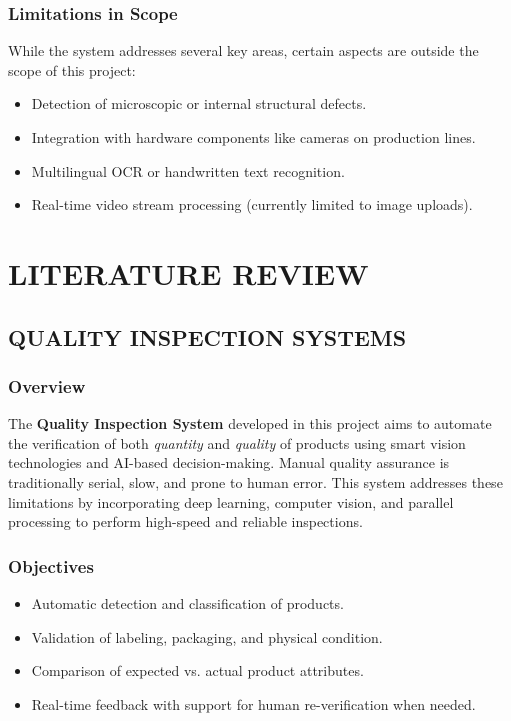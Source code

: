 \documentclass[12pt]{report}
\begin{document}
\subsection{Limitations in Scope}

While the system addresses several key areas, certain aspects are outside the scope of this project:

\begin{itemize}
    \item Detection of microscopic or internal structural defects.
    \item Integration with hardware components like cameras on production lines.
    \item Multilingual OCR or handwritten text recognition.
    \item Real-time video stream processing (currently limited to image uploads).
\end{itemize}










\newpage
\chapter{LITERATURE REVIEW}
\section{QUALITY INSPECTION SYSTEMS}
\subsection{Overview}
The \textbf{Quality Inspection System} developed in this project aims to automate the verification of both \textit{quantity} and \textit{quality} of products using smart vision technologies and AI-based decision-making. Manual quality assurance is traditionally serial, slow, and prone to human error. This system addresses these limitations by incorporating deep learning, computer vision, and parallel processing to perform high-speed and reliable inspections.

\subsection{Objectives}
\begin{itemize}
    \item Automatic detection and classification of products.
    \item Validation of labeling, packaging, and physical condition.
    \item Comparison of expected vs. actual product attributes.
    \item Real-time feedback with support for human re-verification when needed.
\end{itemize}
\end{document}
